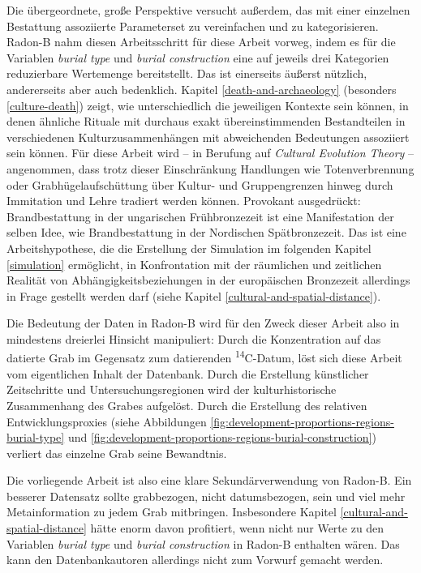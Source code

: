 \documentclass[openany,twoside,twocolumn]{book}
\begin{document}
Die übergeordnete, große Perspektive versucht außerdem, das mit einer einzelnen Bestattung assoziierte Parameterset zu vereinfachen und zu kategorisieren. Radon-B nahm diesen Arbeitsschritt für diese Arbeit vorweg, indem es für die Variablen \emph{burial type} und \emph{burial construction} eine auf jeweils drei Kategorien reduzierbare Wertemenge bereitstellt. Das ist einerseits äußerst nützlich, andererseits aber auch bedenklich. Kapitel \ref{death-and-archaeology} (besonders \ref{culture-death}) zeigt, wie unterschiedlich die jeweiligen Kontexte sein können, in denen ähnliche Rituale mit durchaus exakt übereinstimmenden Bestandteilen in verschiedenen Kulturzusammenhängen mit abweichenden Bedeutungen assoziiert sein können. Für diese Arbeit wird -- in Berufung auf \emph{Cultural Evolution Theory} -- angenommen, dass trotz dieser Einschränkung Handlungen wie Totenverbrennung oder Grabhügelaufschüttung über Kultur- und Gruppengrenzen hinweg durch Immitation und Lehre tradiert werden können. Provokant ausgedrückt: Brandbestattung in der ungarischen Frühbronzezeit ist eine Manifestation der selben Idee, wie Brandbestattung in der Nordischen Spätbronzezeit. Das ist eine Arbeitshypothese, die die Erstellung der Simulation im folgenden Kapitel \ref{simulation} ermöglicht, in Konfrontation mit der räumlichen und zeitlichen Realität von Abhängigkeitsbeziehungen in der europäischen Bronzezeit allerdings in Frage gestellt werden darf (siehe Kapitel \ref{cultural-and-spatial-distance}).

Die Bedeutung der Daten in Radon-B wird für den Zweck dieser Arbeit also in mindestens dreierlei Hinsicht manipuliert: Durch die Konzentration auf das datierte Grab im Gegensatz zum datierenden \textsuperscript{14}C-Datum, löst sich diese Arbeit vom eigentlichen Inhalt der Datenbank. Durch die Erstellung künstlicher Zeitschritte und Untersuchungsregionen wird der kulturhistorische Zusammenhang des Grabes aufgelöst. Durch die Erstellung des relativen Entwicklungsproxies (siehe Abbildungen \ref{fig:development-proportions-regions-burial-type} und \ref{fig:development-proportions-regions-burial-construction}) verliert das einzelne Grab seine Bewandtnis.

Die vorliegende Arbeit ist also eine klare Sekundärverwendung von Radon-B. Ein besserer Datensatz sollte grabbezogen, nicht datumsbezogen, sein und viel mehr Metainformation zu jedem Grab mitbringen. Insbesondere Kapitel \ref{cultural-and-spatial-distance} hätte enorm davon profitiert, wenn nicht nur Werte zu den Variablen \emph{burial type} und \emph{burial construction} in Radon-B enthalten wären. Das kann den Datenbankautoren allerdings nicht zum Vorwurf gemacht werden.
\end{document}
